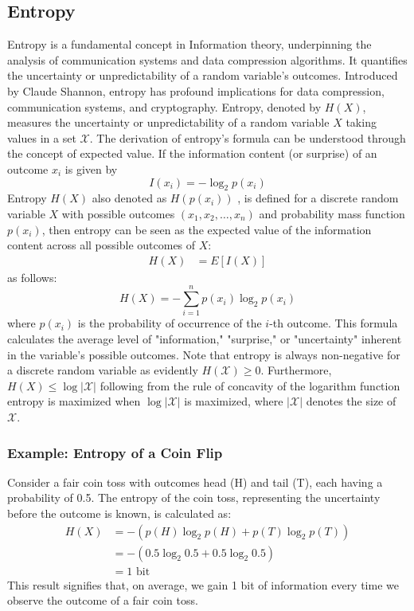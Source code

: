 \documentclass[12pt]{article}
\begin{document}
	\subsection{Entropy}
	Entropy is a fundamental concept in Information theory, underpinning the analysis of communication systems and data compression algorithms. It quantifies the uncertainty or unpredictability of a random variable's outcomes. Introduced by Claude Shannon, entropy has profound implications for data compression, communication systems, and cryptography. Entropy, denoted by $H(X)$, measures the uncertainty or unpredictability of a random variable $X$ taking values in a set $\mathcal{X}$.  The derivation of entropy's formula can be understood through the concept of expected value. If the information content (or surprise) of an outcome $x_i$ is given by 
	\begin{equation}
		I(x_i) = -\log_2 p(x_i)
	\end{equation}
	Entropy  $H(X)$ also denoted as $H(p(x_i))$ , is defined for a discrete random variable $X$ with possible outcomes $(x_1, x_2, \ldots, x_n)$ and probability mass function $p(x_i)$, then entropy can be seen as the expected value of the information content across all possible outcomes of $X$:
	\begin{align}
		H(X) &= E[I(X)] 
	\end{align}
	as follows:
	\begin{equation}
		H(X) = -\sum_{i=1}^{n} p(x_i) \log_2 p(x_i)
	\end{equation}
	where $p(x_i)$ is the probability of occurrence of the $i$-th outcome. This formula calculates the average level of "information," "surprise," or "uncertainty" inherent in the variable's possible outcomes. Note  that entropy is always non-negative for  a discrete random variable as evidently $H(\mathcal{X}) \geq 0$. Furthermore, $H(X) \leq \log | \mathcal{X} |$ following from the rule of concavity of the logarithm function entropy is maximized when $ \log | \mathcal{X} |$ is maximized, where $|\mathcal{X} |$ denotes the size of $\mathcal{X}$.
	
	\subsubsection{Example: Entropy of a Coin Flip}
	
	Consider a fair coin toss with outcomes head (H) and tail (T), each having a probability of 0.5. The entropy of the coin toss, representing the uncertainty before the outcome is known, is calculated as:
	\begin{align}
		H(X) &= -\left( p(H) \log_2 p(H) + p(T) \log_2 p(T) \right) \\
		&= -\left( 0.5 \log_2 0.5 + 0.5 \log_2 0.5 \right) \\
		&= 1 \text{ bit}
	\end{align}
	This result signifies that, on average, we gain 1 bit of information every time we observe the outcome of a fair coin toss.
\end{document}
